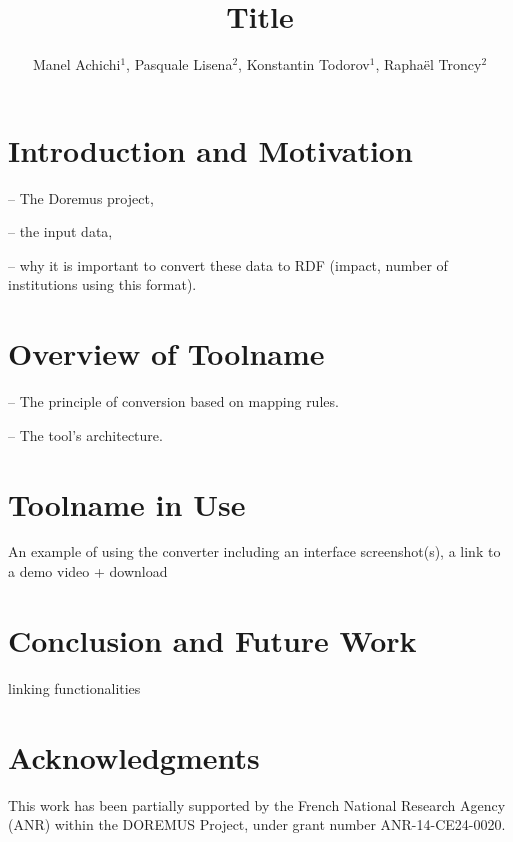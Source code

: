\documentclass[runningheads,a4paper]{llncs}
\begin{document}
\title{Title}


\author{Manel Achichi$^1$, Pasquale Lisena$^2$, Konstantin Todorov$^1$, Rapha\"{e}l Troncy$^2$}

\maketitle


\begin{abstract}

\end{abstract}


\section{Introduction and Motivation}

-- The Doremus project,

-- the input data,

-- why it is important to convert these data to RDF (impact, number of institutions using this format).

\section{Overview of Toolname}

-- The principle of conversion based on mapping rules.

-- The tool's architecture.

\section{Toolname in Use}

An example of using the converter including an interface screenshot(s), a link to a demo video + download

\section{Conclusion and Future Work}

linking functionalities

\section*{Acknowledgments}
This work has been partially supported by the French National Research Agency (ANR) within the DOREMUS Project, under grant number ANR-14-CE24-0020.



\end{document}
